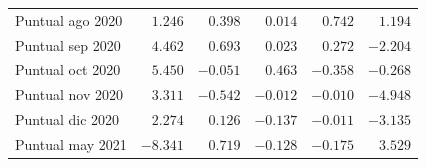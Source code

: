 \begin{table}[H]
\begin{tabular}{@{}lrrrrr@{}}
Puntual ago 2020 & $1.246$ & $0.398$ & $0.014$ & $0.742$ & $1.194$ \\
Puntual sep 2020 & $4.462$ & $0.693$ & $0.023$ & $0.272$ & $-2.204$ \\
Puntual oct 2020 & $5.450$ & $-0.051$ & $0.463$ & $-0.358$ & $-0.268$ \\
Puntual nov 2020 & $3.311$ & $-0.542$ & $-0.012$ & $-0.010$ & $-4.948$ \\
Puntual dic 2020 & $2.274$ & $0.126$ & $-0.137$ & $-0.011$ & $-3.135$ \\
Puntual may 2021 & $-8.341$ & $0.719$ & $-0.128$ & $-0.175$ & $3.529$ \\
\bottomrule
\end{tabular}
\end{table}
